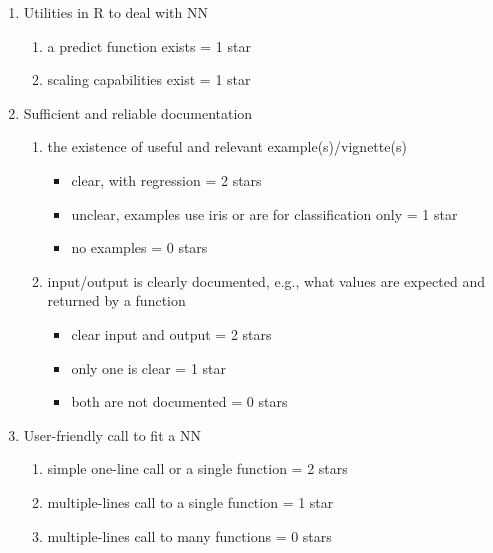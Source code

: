 \begin{enumerate}
\def\labelenumi{\arabic{enumi}.}
\tightlist
\item
  Utilities in R to deal with NN

  \begin{enumerate}
  \def\labelenumii{\alph{enumii}.}
  \tightlist
  \item
    a predict function exists = 1 star
  \item
    scaling capabilities exist = 1 star
  \end{enumerate}
\item
  Sufficient and reliable documentation

  \begin{enumerate}
  \def\labelenumii{\alph{enumii}.}
  \tightlist
  \item
    the existence of useful and relevant example(s)/vignette(s)

    \begin{itemize}
    \tightlist
    \item
      clear, with regression = 2 stars
    \item
      unclear, examples use iris or are for classification only = 1 star
    \item
      no examples = 0 stars
    \end{itemize}
  \item
    input/output is clearly documented, e.g., what values are expected
    and returned by a function

    \begin{itemize}
    \tightlist
    \item
      clear input and output = 2 stars
    \item
      only one is clear = 1 star
    \item
      both are not documented = 0 stars
    \end{itemize}
  \end{enumerate}
\item
  User-friendly call to fit a NN

  \begin{enumerate}
  \def\labelenumii{\alph{enumii}.}
  \tightlist
  \item
    simple one-line call or a single function = 2 stars
  \item
    multiple-lines call to a single function = 1 star
  \item
    multiple-lines call to many functions = 0 stars
  \end{enumerate}
\end{enumerate}


